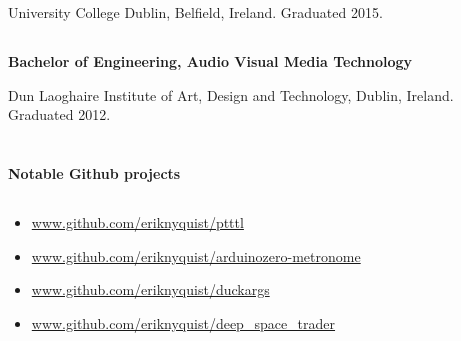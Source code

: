 \documentclass[6pt]{article}
\begin{document}
\begin{minipage}{38em}
\begin{flushleft}
University College Dublin, Belfield, Ireland. Graduated 2015.

\subsection*{}
{\bfseries Bachelor of Engineering, Audio Visual Media Technology}

Dun Laoghaire Institute of Art, Design and Technology, Dublin, Ireland. Graduated 2012.
\end{flushleft}

\section*{}
{\Large \bfseries Notable Github projects}

\dotfill
\subsection*{}
\begin{itemize}
    \setlength\itemsep{0em}
    \item \url{www.github.com/eriknyquist/ptttl}
    \item \url{www.github.com/eriknyquist/arduinozero-metronome}
    \item \url{www.github.com/eriknyquist/duckargs}
    \item \url{www.github.com/eriknyquist/deep\_space\_trader}
\end{itemize}

\end{minipage}
\end{document}
